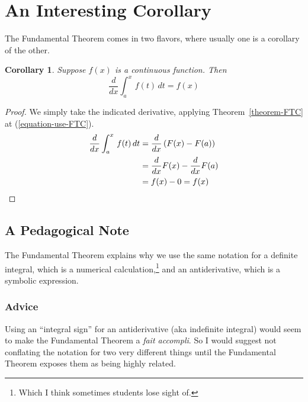 \documentclass[10pt,]{article}
\theoremstyle{plain}
\newtheorem{corollary}[theorem]{Corollary}
\theoremstyle{definition}
\newcommand{\definiteintegral}[4]{\int_{#1}^{#2}\,#3\,d#4}
\begin{document}
\section{An Interesting Corollary}\label{section-4}
%
The Fundamental Theorem comes in two flavors, where usually one is a corollary of the other.
%
\begin{corollary}\label{corollary-1}
Suppose $f(x)$ is a continuous function.  Then \begin{displaymath}\frac{d}{dx}\definiteintegral{a}{x}{f(t)}{t}=f(x)\end{displaymath}
%
\end{corollary}
%
\begin{proof}
We simply take the indicated derivative, applying Theorem~\cref{theorem-FTC} at (\cref{equation-use-FTC}).
%
\begin{align}
\frac{d}{dx}\definiteintegral{a}{x}{f(t)}{t}&=\frac{d}{dx}\left(F(x)-F(a)\right)\label{equation-use-FTC}\\
&=\frac{d}{dx}F(x)-\frac{d}{dx}F(a)\notag\\
&=f(x)-0 = f(x)\label{}
\end{align}\end{proof}
%
\typeout{************************************************}
\typeout{************************************************}
%
\subsection{A Pedagogical Note}\label{subsection-1}
%
The Fundamental Theorem explains why we use the same notation for a definite integral, which is a numerical calculation,\footnote{Which I think sometimes students lose sight of.} and an antiderivative, which is a symbolic expression.
%
\typeout{************************************************}
\typeout{************************************************}
%
\subsubsection{Advice}\label{subsubsection-1}
%
Using an ``integral sign'' for an antiderivative (aka indefinite integral) would seem to make the Fundamental Theorem a \textit{fait accompli}.  So I would suggest not conflating the notation for two very different things until the Fundamental Theorem exposes them as being highly related.
%
\typeout{************************************************}
\typeout{************************************************}
%
\end{document}
